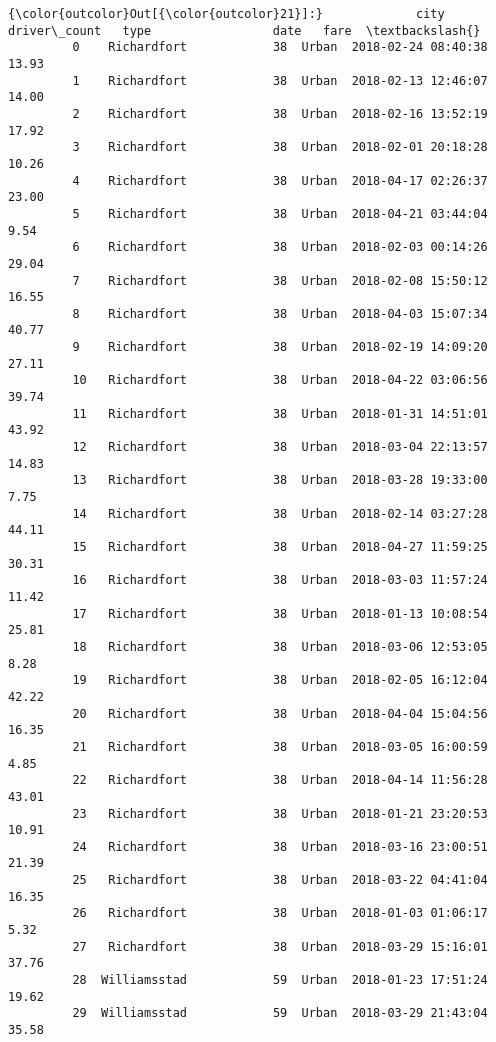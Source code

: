 \documentclass[11pt]{article}
\begin{document}
\begin{Verbatim}[commandchars=\\\{\}]
{\color{outcolor}Out[{\color{outcolor}21}]:}             city  driver\_count   type                 date   fare  \textbackslash{}
         0    Richardfort            38  Urban  2018-02-24 08:40:38  13.93   
         1    Richardfort            38  Urban  2018-02-13 12:46:07  14.00   
         2    Richardfort            38  Urban  2018-02-16 13:52:19  17.92   
         3    Richardfort            38  Urban  2018-02-01 20:18:28  10.26   
         4    Richardfort            38  Urban  2018-04-17 02:26:37  23.00   
         5    Richardfort            38  Urban  2018-04-21 03:44:04   9.54   
         6    Richardfort            38  Urban  2018-02-03 00:14:26  29.04   
         7    Richardfort            38  Urban  2018-02-08 15:50:12  16.55   
         8    Richardfort            38  Urban  2018-04-03 15:07:34  40.77   
         9    Richardfort            38  Urban  2018-02-19 14:09:20  27.11   
         10   Richardfort            38  Urban  2018-04-22 03:06:56  39.74   
         11   Richardfort            38  Urban  2018-01-31 14:51:01  43.92   
         12   Richardfort            38  Urban  2018-03-04 22:13:57  14.83   
         13   Richardfort            38  Urban  2018-03-28 19:33:00   7.75   
         14   Richardfort            38  Urban  2018-02-14 03:27:28  44.11   
         15   Richardfort            38  Urban  2018-04-27 11:59:25  30.31   
         16   Richardfort            38  Urban  2018-03-03 11:57:24  11.42   
         17   Richardfort            38  Urban  2018-01-13 10:08:54  25.81   
         18   Richardfort            38  Urban  2018-03-06 12:53:05   8.28   
         19   Richardfort            38  Urban  2018-02-05 16:12:04  42.22   
         20   Richardfort            38  Urban  2018-04-04 15:04:56  16.35   
         21   Richardfort            38  Urban  2018-03-05 16:00:59   4.85   
         22   Richardfort            38  Urban  2018-04-14 11:56:28  43.01   
         23   Richardfort            38  Urban  2018-01-21 23:20:53  10.91   
         24   Richardfort            38  Urban  2018-03-16 23:00:51  21.39   
         25   Richardfort            38  Urban  2018-03-22 04:41:04  16.35   
         26   Richardfort            38  Urban  2018-01-03 01:06:17   5.32   
         27   Richardfort            38  Urban  2018-03-29 15:16:01  37.76   
         28  Williamsstad            59  Urban  2018-01-23 17:51:24  19.62   
         29  Williamsstad            59  Urban  2018-03-29 21:43:04  35.58   
         

\end{Verbatim}
\end{document}
